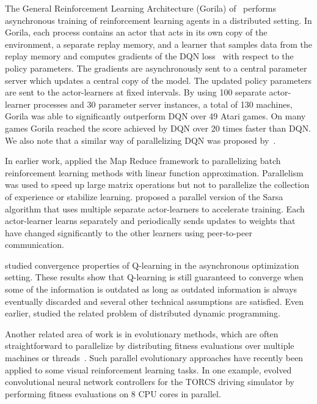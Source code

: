 \documentclass{article} \usepackage{times}
\begin{document}
The General Reinforcement Learning Architecture (Gorila) of~\cite{nair2015gorila} performs asynchronous training of reinforcement learning agents in a distributed setting.
In Gorila, each process contains an actor that acts in its own copy of the environment, a separate replay memory, and a learner that samples data from the replay memory and computes gradients of the DQN loss~\citep{mnih-dqn-2015} with respect to the policy parameters.
The gradients are asynchronously sent to a central parameter server which updates a central copy of the model.
The updated policy parameters are sent to the actor-learners at fixed intervals.
By using 100 separate actor-learner processes and 30 parameter server instances, a total of 130 machines, Gorila was able to significantly outperform DQN over 49 Atari games.
On many games Gorila reached the score achieved by DQN over 20 times faster than DQN.
We also note that a similar way of parallelizing DQN was proposed by~\cite{chavez2015deepq}.

In earlier work, \cite{li:mapreduce} applied the Map Reduce framework to parallelizing batch reinforcement learning methods with linear function approximation.
Parallelism was used to speed up large matrix operations but not to parallelize the collection of experience or stabilize learning.
\cite{grounds:parallelRL} proposed a parallel version of the Sarsa algorithm that uses multiple separate actor-learners to accelerate training.
Each actor-learner learns separately and periodically sends updates to weights that have changed significantly to the other learners using peer-to-peer communication.

\cite{tsitsiklis1994asynchronous} studied convergence properties of Q-learning in the asynchronous optimization setting.
These results show that Q-learning is still guaranteed to converge when some of the information is outdated as long as outdated information is always eventually discarded and several other technical assumptions are satisfied.
Even earlier, \cite{bertsekas1982distributed} studied the related problem of distributed dynamic programming.

Another related area of work is in evolutionary methods, which are often straightforward to parallelize by distributing fitness evaluations over multiple machines or threads~\citep{tomassini1999parallel}.
Such parallel evolutionary approaches have recently been applied to some visual reinforcement learning tasks.
In one example, \cite{koutnik2014} evolved convolutional neural network controllers for the TORCS driving simulator by performing fitness evaluations on 8 CPU cores in parallel.
 \vspace{-0.1cm}
\end{document}
